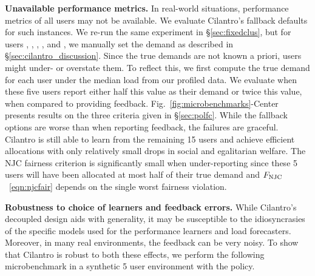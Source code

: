 \textbf{Unavailable performance metrics.}
In real-world situations, performance metrics of all users may not be available.
We evaluate Cilantro's fallback defaults for
such instances.
We re-run the same experiment in \S\ref{sec:fixedclus}, but for users
, , , , and , we manually set
the demand as described in \S\ref{sec:cilantro_discussion}.
Since the true demands are not known a priori, users might under- or overstate them.
To reflect this, we first
compute the true demand for each user under the median load from our profiled data.
We evaluate \cilantronjcs when these five users report either half this value as their demand or twice this value, when compared to providing feedback.
Fig.~\ref{fig:microbenchmarks}-Center presents results %
on the three criteria given in \S\ref{sec:polfc}.
While the fallback options are worse than when reporting feedback,
the failures are graceful.
Cilantro is still able to learn
from the remaining 15 users and achieve efficient allocations with only relatively small
drops in social and egalitarian welfare.
The NJC fairness criterion is significantly small when under-reporting since these 5
users will have been allocated at most half of their true demand and $F_{\rm NJC}$~\eqref{eqn:njcfair} depends on the single worst fairness violation.

\textbf{Robustness to choice of learners and feedback errors.}
While Cilantro's decoupled design aids with generality, it may be susceptible to the idiosyncrasies
of the specific models used for the performance learners and load forecasters.
Moreover, in many real environments, the feedback can be very noisy.
To show that Cilantro is robust to both these effects, we perform the following
microbenchmark in a synthetic 5 user environment with the
\cilantronjcs policy.

